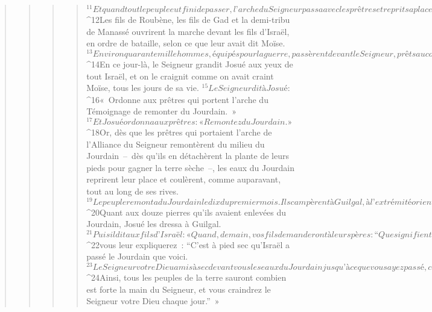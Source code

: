 \begin{verse}
\begin{verse}
\begin{verse}
\begin{verse}
${}^{11}Et quand tout le peuple eut fini de passer, l’arche du Seigneur passa avec les prêtres et reprit sa place en tête du peuple. 
${}^{12}Les fils de Roubène, les fils de Gad et la demi-tribu de Manassé ouvrirent la marche devant les fils d’Israël, en ordre de bataille, selon ce que leur avait dit Moïse. 
${}^{13}Environ quarante mille hommes, équipés pour la guerre, passèrent devant le Seigneur, prêts au combat, vers les steppes de Jéricho. 
${}^{14}En ce jour-là, le Seigneur grandit Josué aux yeux de tout Israël, et on le craignit comme on avait craint Moïse, tous les jours de sa vie.
${}^{15}Le Seigneur dit à Josué : 
${}^{16}« Ordonne aux prêtres qui portent l’arche du Témoignage de remonter du Jourdain. » 
${}^{17}Et Josué ordonna aux prêtres : « Remontez du Jourdain. »
${}^{18}Or, dès que les prêtres qui portaient l’arche de l’Alliance du Seigneur remontèrent du milieu du Jourdain – dès qu’ils en détachèrent la plante de leurs pieds pour gagner la terre sèche –, les eaux du Jourdain reprirent leur place et coulèrent, comme auparavant, tout au long de ses rives.
${}^{19}Le peuple remonta du Jourdain le dix du premier mois. Ils campèrent à Guilgal, à l’extrémité orientale de Jéricho. 
${}^{20}Quant aux douze pierres qu’ils avaient enlevées du Jourdain, Josué les dressa à Guilgal. 
${}^{21}Puis il dit aux fils d’Israël : « Quand, demain, vos fils demanderont à leurs pères : “Que signifient ces pierres ?”, 
${}^{22}vous leur expliquerez : “C’est à pied sec qu’Israël a passé le Jourdain que voici. 
${}^{23}Le Seigneur votre Dieu a mis à sec devant vous les eaux du Jourdain jusqu’à ce que vous ayez passé, comme le Seigneur votre Dieu l’avait fait en asséchant devant nous la mer des Roseaux jusqu’à ce que nous ayons passé. 
${}^{24}Ainsi, tous les peuples de la terre sauront combien est forte la main du Seigneur, et vous craindrez le Seigneur votre Dieu chaque jour.” »
      

\end{verse}
\end{verse}
\end{verse}
\end{verse}

